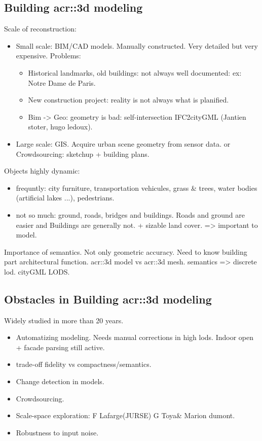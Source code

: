     \subsection{Building \gls*{acr::3d} modeling}
        \label{subsec::introduction::urban_3d_reconstruction::building_3d_modeling}
        Scale of reconstruction:
        \begin{itemize}
            \item Small scale: BIM/CAD models. Manually constructed. Very detailed but very expensive. Problems:
            \begin{itemize}
                \item Historical landmarks, old buildings: not always well documented: ex: Notre Dame de Paris. 
                \item New construction project: reality is not always what is planified. 
                \item Bim -> Geo: geometry is bad: self-intersection IFC2cityGML (Jantien stoter, hugo ledoux). 
            \end{itemize}
            \item Large scale: GIS. Acquire urban scene geometry from sensor data. or Crowdsourcing: sketchup + building plans.
        \end{itemize}
        Objects highly dynamic:
        \begin{itemize}
            \item frequntly: city furniture, transportation vehicules, grass \& trees, water bodies (artificial lakes ...), pedestrians. 
            \item not so much: ground, roads, bridges and buildings. Roads and ground are easier and Buildings are generally not. + sizable land cover. => important to model.\\
        \end{itemize}
        Importance of semantics. Not only geometric accuracy. Need to know building part architectural function. \gls{acr::3d} model vs \gls{acr::3d} mesh.
        semantics => discrete lod. cityGML LODS.\\
    \subsection{Obstacles in Building \gls{acr::3d} modeling}
        \label{subsec::introduction::urban_3d_reconstruction::challenges}
        Widely studied in more than 20 years.\\
        \begin{itemize}
            \item Automatizing modeling. Needs manual corrections in high lods. Indoor open + facade parsing still active. 
            \item trade-off fidelity vs compactness/semantics. 
            \item Change detection in models. 
            \item Crowdsourcing. 
            \item Scale-space exploration: F Lafarge(JURSE) G Toya\& Marion dumont. 
            \item Robustness to input noise.
        \end{itemize}
